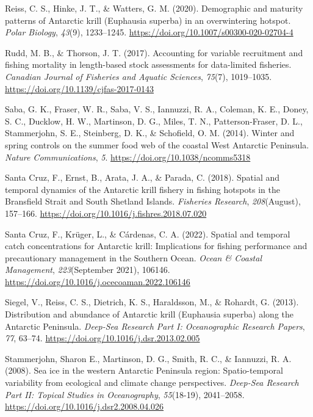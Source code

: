 \documentclass[
]{article}
\newlength{\cslhangindent}
\newlength{\cslentryspacingunit} %
\newenvironment{CSLReferences}[2] %
 {%
  \setlength{\parindent}{0pt}
  \ifodd #1
  \let\oldpar\par
  \def\par{\hangindent=\cslhangindent\oldpar}
  \fi
  \setlength{\parskip}{#2\cslentryspacingunit}
 }%
 {}
\begin{document}
\begin{CSLReferences}{1}{0}
\leavevmode{}%
Reiss, C. S., Hinke, J. T., \& Watters, G. M. (2020). {Demographic and
maturity patterns of Antarctic krill (Euphausia superba) in an
overwintering hotspot}. \emph{Polar Biology}, \emph{43}(9), 1233--1245.
\url{https://doi.org/10.1007/s00300-020-02704-4}

\leavevmode{}%
Rudd, M. B., \& Thorson, J. T. (2017). {Accounting for variable
recruitment and fishing mortality in length-based stock assessments for
data-limited fisheries}. \emph{Canadian Journal of Fisheries and Aquatic
Sciences}, \emph{75}(7), 1019--1035.
\url{https://doi.org/10.1139/cjfas-2017-0143}

\leavevmode{}%
Saba, G. K., Fraser, W. R., Saba, V. S., Iannuzzi, R. A., Coleman, K.
E., Doney, S. C., Ducklow, H. W., Martinson, D. G., Miles, T. N.,
Patterson-Fraser, D. L., Stammerjohn, S. E., Steinberg, D. K., \&
Schofield, O. M. (2014). {Winter and spring controls on the summer food
web of the coastal West Antarctic Peninsula}. \emph{Nature
Communications}, \emph{5}. \url{https://doi.org/10.1038/ncomms5318}

\leavevmode{}%
Santa Cruz, F., Ernst, B., Arata, J. A., \& Parada, C. (2018). {Spatial
and temporal dynamics of the Antarctic krill fishery in fishing hotspots
in the Bransfield Strait and South Shetland Islands}. \emph{Fisheries
Research}, \emph{208}(August), 157--166.
\url{https://doi.org/10.1016/j.fishres.2018.07.020}

\leavevmode{}%
Santa Cruz, F., Krüger, L., \& Cárdenas, C. A. (2022). {Spatial and
temporal catch concentrations for Antarctic krill: Implications for
fishing performance and precautionary management in the Southern Ocean}.
\emph{Ocean {\&} Coastal Management}, \emph{223}(September 2021),
106146. \url{https://doi.org/10.1016/j.ocecoaman.2022.106146}

\leavevmode{}%
Siegel, V., Reiss, C. S., Dietrich, K. S., Haraldsson, M., \& Rohardt,
G. (2013). {Distribution and abundance of Antarctic krill (Euphausia
superba) along the Antarctic Peninsula}. \emph{Deep-Sea Research Part I:
Oceanographic Research Papers}, \emph{77}, 63--74.
\url{https://doi.org/10.1016/j.dsr.2013.02.005}

\leavevmode{}%
Stammerjohn, Sharon E., Martinson, D. G., Smith, R. C., \& Iannuzzi, R.
A. (2008). {Sea ice in the western Antarctic Peninsula region:
Spatio-temporal variability from ecological and climate change
perspectives}. \emph{Deep-Sea Research Part II: Topical Studies in
Oceanography}, \emph{55}(18-19), 2041--2058.
\url{https://doi.org/10.1016/j.dsr2.2008.04.026}


\end{CSLReferences}
\end{document}
